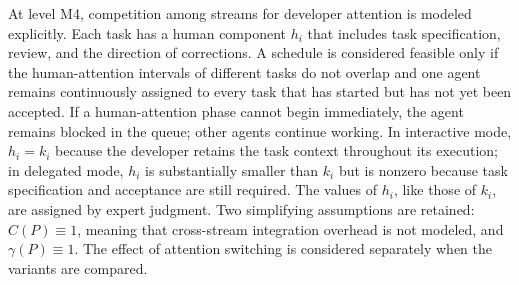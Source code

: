 At level M4, competition among streams for developer attention is modeled
explicitly. Each task has a human component $h_i$ that includes task
specification, review, and the direction of corrections. A schedule is
considered feasible only if the human-attention intervals of different tasks do
not overlap and one agent remains continuously assigned to every task that has
started but has not yet been accepted. If a human-attention phase cannot begin
immediately, the agent remains blocked in the queue; other agents continue
working. In interactive mode, $h_i = k_i$ because the developer retains the
task context throughout its execution; in delegated mode, $h_i$ is
substantially smaller than $k_i$ but is nonzero because task specification and
acceptance are still required. The values of $h_i$, like those of $k_i$, are
assigned by expert judgment. Two simplifying assumptions are retained:
$C(P) \equiv 1$, meaning that cross-stream integration overhead is not modeled,
and $\gamma(P) \equiv 1$. The effect of attention switching is considered
separately when the variants are compared.
